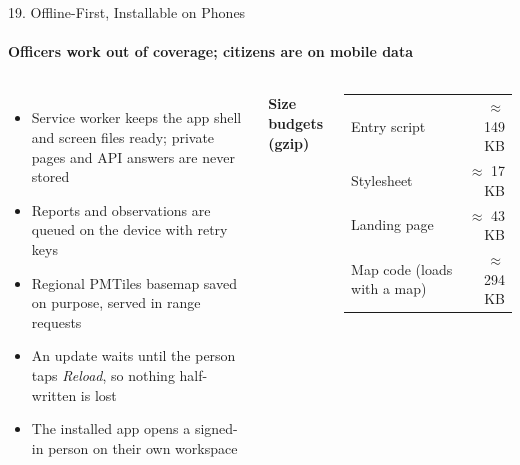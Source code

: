 \begin{frame}{19. Offline-First, Installable on Phones}
\framesubtitle{Officers work out of coverage; citizens are on mobile data}
\scriptsize
\begin{columns}[T,onlytextwidth]
    \begin{itemize}\setlength\itemsep{3pt}
        \item Service worker keeps the app shell and screen files ready; private pages and API answers are never stored
        \item Reports and observations are queued on the device with retry keys
        \item Regional PMTiles basemap saved on purpose, served in range requests
        \item An update waits until the person taps \emph{Reload}, so nothing half-written is lost
        \item The installed app opens a signed-in person on their own workspace
    \end{itemize}
    \textbf{\textcolor{amritaMaroon}{Size budgets (gzip)}}
    \renewcommand{\arraystretch}{1.2}
    \begin{tabular}{lr}
    \toprule
    Entry script & $\approx$ 149 KB \\
    Stylesheet & $\approx$ 17 KB \\
    Landing page & $\approx$ 43 KB \\
    Map code (loads with a map) & $\approx$ 294 KB \\
    \bottomrule
    \end{tabular}
\end{columns}
\end{frame}

